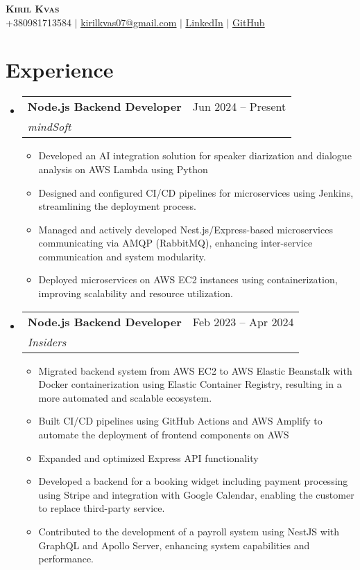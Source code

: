 \documentclass[letterpaper,11pt]{article}
\makeatletter
\newcommand{\resumeItem}[1]{
  \item\small{
    {#1 \vspace{-2pt}}
  }
}
\newcommand{\resumeSubheading}[4]{
  \vspace{-2pt}\item
    \begin{tabular*}{0.97\textwidth}[t]{l@{\extracolsep{\fill}}r}
      \textbf{#1} & #2 \\
      \textit{\small#3} & \textit{\small #4} \\
    \end{tabular*}\vspace{-7pt}
}
\newcommand{\resumeSubHeadingListStart}{\begin{itemize}[leftmargin=0.15in, label={}]}
\newcommand{\resumeSubHeadingListEnd}{\end{itemize}}
\newcommand{\resumeItemListStart}{\begin{itemize}}
\newcommand{\resumeItemListEnd}{\end{itemize}\vspace{-5pt}}
\makeatother
\begin{document}
\begin{center}
    \textbf{\Huge \scshape Kiril Kvas} \\ \vspace{1pt}
    \small +380981713584 $|$ \href{mailto:kirilkvas07@gmail.com}{\underline{kirilkvas07@gmail.com}} $|$ 
    \href{https://www.linkedin.com/in/kiril-kvas-999154239/}{\underline{LinkedIn}} $|$
    \href{https://github.com/rillsvai}{\underline{GitHub}}
\end{center}

\section{Experience}
\resumeSubHeadingListStart
    \resumeSubheading
      {Node.js Backend Developer}{Jun 2024 -- Present}
      {mindSoft}{}
      \resumeItemListStart
        \resumeItem{Developed an AI integration solution for speaker diarization and dialogue analysis on AWS Lambda using Python}
        \resumeItem{Designed and configured CI/CD pipelines for microservices using Jenkins, streamlining the deployment process.}
        \resumeItem{Managed and actively developed Nest.js/Express-based microservices communicating via AMQP (RabbitMQ), enhancing inter-service communication and system modularity.}
        \resumeItem{Deployed microservices on AWS EC2 instances using containerization, improving scalability and resource utilization.}
      \resumeItemListEnd
\resumeSubHeadingListEnd

\resumeSubHeadingListStart
    \resumeSubheading
      {Node.js Backend Developer}{Feb 2023 -- Apr 2024}
      {Insiders}{}
      \resumeItemListStart
            \resumeItem{Migrated backend system from AWS EC2 to AWS Elastic Beanstalk with Docker containerization using Elastic Container Registry, resulting in a more automated and scalable ecosystem.}
            \resumeItem{Built CI/CD pipelines using GitHub Actions and AWS Amplify to automate the deployment of frontend components on AWS}
            \resumeItem{Expanded and optimized Express API functionality}
            \resumeItem{Developed a backend for a booking widget including payment processing using Stripe and integration with Google Calendar, enabling the customer to replace third-party service.}
            \resumeItem{Contributed to the development of a payroll system using NestJS with GraphQL and Apollo Server, enhancing system capabilities and performance.}
      \resumeItemListEnd
\resumeSubHeadingListEnd
\end{document}
